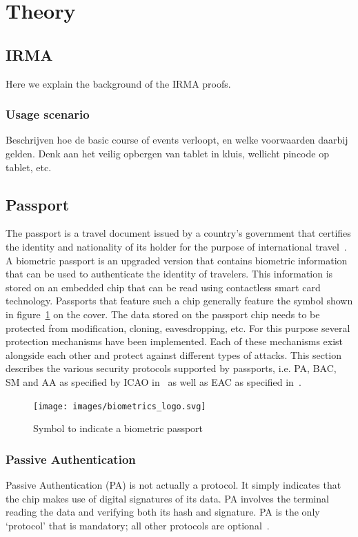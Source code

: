 \section{Theory}
\subsection{IRMA}
Here we explain the background of the IRMA proofs.

\subsubsection{Usage scenario}
Beschrijven hoe de basic course of events verloopt, en welke voorwaarden daarbij gelden. Denk aan het veilig opbergen van tablet in kluis, wellicht pincode op tablet, etc.

\subsection{Passport}
The passport is a travel document issued by a country's government that certifies the identity and nationality of its holder for the purpose of international travel~\cite{passportdefinition}. A biometric passport is an upgraded version that contains biometric information that can be used to authenticate the identity of travelers. This information is stored on an embedded chip that can be read using contactless smart card technology. Passports that feature such a chip generally feature the symbol shown in figure~\ref{fig:biometricslogo} on the cover. The data stored on the passport chip needs to be protected from modification, cloning, eavesdropping, etc. For this purpose several protection mechanisms have been implemented. Each of these mechanisms exist alongside each other and protect against different types of attacks. This section describes the various security protocols supported by passports, i.e. PA, BAC, SM and AA as specified by ICAO in~\cite{icao} as well as EAC as specified in~\cite{bsi}. 

\begin{figure}[htb]
	\centering
		\texttt{[image: images/biometrics\_logo.svg]}
	\caption{Symbol to indicate a biometric passport}
	\label{fig:biometricslogo}
\end{figure}

\subsubsection{Passive Authentication}
Passive Authentication (PA) is not actually a protocol. It simply indicates that the chip makes use of digital signatures of its data. PA involves the terminal reading the data and verifying both its hash and signature. PA is the only `protocol' that is mandatory; all other protocols are optional~\cite{mostowski2010electronic}.

